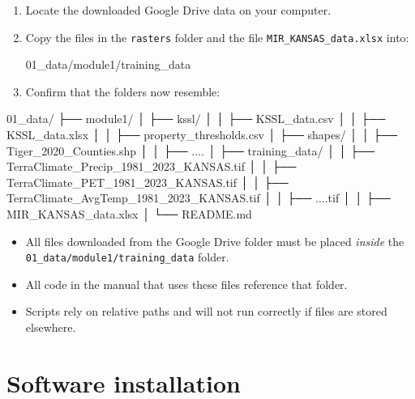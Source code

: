 \documentclass[
  10pt,
  b5paper,
  oneside]{book}
\newenvironment{Shaded}{\begin{snugshade}}{\end{snugshade}}
\newcommand{\NormalTok}[1]{#1}
\providecommand{\tightlist}{%
  \setlength{\itemsep}{0pt}\setlength{\parskip}{0pt}}
\begin{document}
\begin{enumerate}
\def\labelenumi{\arabic{enumi}.}
\item
  Locate the downloaded Google Drive data on your computer.
\item
  Copy the files in the \texttt{rasters} folder and the file \texttt{MIR\_KANSAS\_data.xlsx} into:

  01\_data/module1/training\_data
\item
  Confirm that the folders now resemble:
\end{enumerate}

\begin{Shaded}
\begin{Highlighting}[]
\NormalTok{   01\_data/  }
\NormalTok{   ├── module1/  }
\NormalTok{   │   ├── kssl/}
\NormalTok{   │   │          ├── KSSL\_data.csv}
\NormalTok{   │   │          ├── KSSL\_data.xlsx}
\NormalTok{   │   │          ├── property\_thresholds.csv}
\NormalTok{   │   ├── shapes/}
\NormalTok{   │   │          ├── Tiger\_2020\_Counties.shp}
\NormalTok{   │   │          ├── .... }
\NormalTok{   │   ├── training\_data/  }
\NormalTok{   │   │                ├── TerraClimate\_Precip\_1981\_2023\_KANSAS.tif  }
\NormalTok{   │   │                ├── TerraClimate\_PET\_1981\_2023\_KANSAS.tif}
\NormalTok{   │   │                ├── TerraClimate\_AvgTemp\_1981\_2023\_KANSAS.tif  }
\NormalTok{   │   │                ├── ....tif  }
\NormalTok{   │   │                ├── MIR\_KANSAS\_data.xlsx  }
\NormalTok{   │   └── README.md  }
\end{Highlighting}
\end{Shaded}

\begin{itemize}
\tightlist
\item
  All files downloaded from the Google Drive folder must be placed \emph{inside} the \texttt{01\_data/module1/training\_data} folder.
\item
  All code in the manual that uses these files reference that folder.
\item
  Scripts rely on relative paths and will not run correctly if files are stored elsewhere.
\end{itemize}

\chapter*{Software installation}\label{software-installation}
\end{document}
